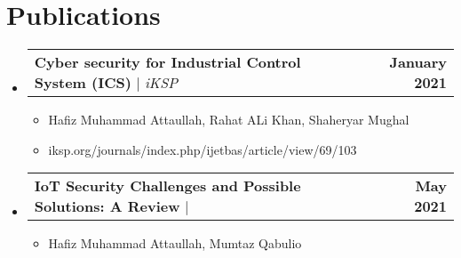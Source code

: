 \documentclass[letterpaper,11pt]{article}
\makeatletter
\newcommand{\resumeItem}[1]{
  \item\small{
    {#1 \vspace{-2pt}}
  }
}
\newcommand{\resumeProjectHeading}[2]{
    \item
    \begin{tabular*}{1.001\textwidth}{l@{\extracolsep{\fill}}r}
      \small#1 & \textbf{\small #2}\\
    \end{tabular*}\vspace{-7pt}
}
\newcommand{\resumeSubHeadingListStart}{\begin{itemize}[leftmargin=0.0in, label={}]}
\newcommand{\resumeSubHeadingListEnd}{\end{itemize}}
\newcommand{\resumeItemListStart}{\begin{itemize}}
\newcommand{\resumeItemListEnd}{\end{itemize}\vspace{-5pt}}
\makeatother
\begin{document}
\section{Publications}
    \vspace{-5pt}
    \resumeSubHeadingListStart
      \resumeProjectHeading
          {\textbf{Cyber security for Industrial Control System (ICS)} $|$ \emph{iKSP}}{January 2021}
          \resumeItemListStart
            \resumeItem{Hafiz Muhammad Attaullah, Rahat ALi Khan, Shaheryar Mughal}
            \resumeItem{iksp.org/journals/index.php/ijetbas/article/view/69/103}
          \resumeItemListEnd
          \vspace{-13pt}
      \resumeProjectHeading
          {\textbf{IoT Security Challenges and Possible Solutions: A Review} $|$ \emph{}}{May 2021}
          \resumeItemListStart
            \resumeItem{Hafiz Muhammad Attaullah, Mumtaz Qabulio}
          \resumeItemListEnd 
          \vspace{-13pt}
    \resumeSubHeadingListEnd
\vspace{-5pt}


%

\end{document}
